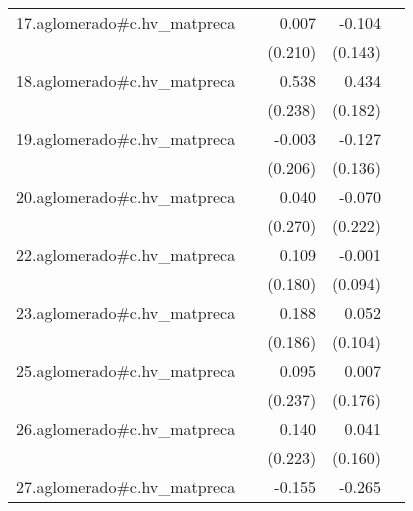{\begin{longtable}{l*{4}{D{.}{.}{-1}}}
\addlinespace
17.aglomerado#c.hv\_matpreca&                     &       0.007         &      -0.104         &                     \\
            &                     &     (0.210)         &     (0.143)         &                     \\
\addlinespace
18.aglomerado#c.hv\_matpreca&                     &       0.538\sym{*}  &       0.434\sym{*}  &                     \\
            &                     &     (0.238)         &     (0.182)         &                     \\
\addlinespace
19.aglomerado#c.hv\_matpreca&                     &      -0.003         &      -0.127         &                     \\
            &                     &     (0.206)         &     (0.136)         &                     \\
\addlinespace
20.aglomerado#c.hv\_matpreca&                     &       0.040         &      -0.070         &                     \\
            &                     &     (0.270)         &     (0.222)         &                     \\
\addlinespace
22.aglomerado#c.hv\_matpreca&                     &       0.109         &      -0.001         &                     \\
            &                     &     (0.180)         &     (0.094)         &                     \\
\addlinespace
23.aglomerado#c.hv\_matpreca&                     &       0.188         &       0.052         &                     \\
            &                     &     (0.186)         &     (0.104)         &                     \\
\addlinespace
25.aglomerado#c.hv\_matpreca&                     &       0.095         &       0.007         &                     \\
            &                     &     (0.237)         &     (0.176)         &                     \\
\addlinespace
26.aglomerado#c.hv\_matpreca&                     &       0.140         &       0.041         &                     \\
            &                     &     (0.223)         &     (0.160)         &                     \\
\addlinespace
27.aglomerado#c.hv\_matpreca&                     &      -0.155         &      -0.265\sym{***}&                     \\

\end{longtable}}
